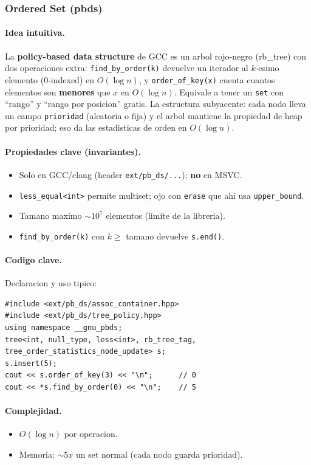 ﻿\subsubsection{Ordered Set (pbds)}

\paragraph{Idea intuitiva.}
La \textbf{policy-based data structure} de GCC es un arbol rojo-negro (rb\_tree) con dos operaciones extra: \texttt{find\_by\_order(k)} devuelve un iterador al $k$-esimo elemento (0-indexed) en $O(\log n)$, y \texttt{order\_of\_key(x)} cuenta cuantos elementos son \textbf{menores} que $x$ en $O(\log n)$. Equivale a tener un \texttt{set} con ``rango'' y ``rango por posicion'' gratis. La estructura subyacente: cada nodo lleva un campo \texttt{prioridad} (aleatoria o fija) y el arbol mantiene la propiedad de heap por prioridad; eso da las estadisticas de orden en $O(\log n)$.

\paragraph{Propiedades clave (invariantes).}
\begin{itemize}\setlength\itemsep{0pt}
	\item Solo en GCC/clang (header \texttt{ext/pb\_ds/...}); \textbf{no} en MSVC.
	\item \texttt{less\_equal<int>} permite multiset; ojo con \texttt{erase} que ahi usa \texttt{upper\_bound}.
	\item Tamano maximo $\sim 10^7$ elementos (limite de la libreria).
	\item \texttt{find\_by\_order(k)} con $k \ge$ tamano devuelve \texttt{s.end()}.
\end{itemize}

\paragraph{Codigo clave.}
Declaracion y uso tipico:
\begin{verbatim}
#include <ext/pb_ds/assoc_container.hpp>
#include <ext/pb_ds/tree_policy.hpp>
using namespace __gnu_pbds;
tree<int, null_type, less<int>, rb_tree_tag, tree_order_statistics_node_update> s;
s.insert(5);
cout << s.order_of_key(3) << "\n";      // 0
cout << *s.find_by_order(0) << "\n";    // 5
\end{verbatim}

\paragraph{Complejidad.}
\begin{itemize}\setlength\itemsep{0pt}
	\item $O(\log n)$ por operacion.
	\item Memoria: $\sim 5x$ un set normal (cada nodo guarda prioridad).
\end{itemize}

